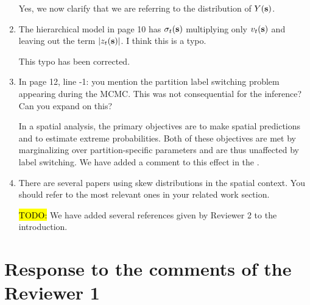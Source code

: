 \documentclass[11pt]{article}
\begin{document}
\begin{enumerate}[1.]
  \begin{response}
    Yes, we now clarify that we are referring to the distribution of $Y(\mbox{\bf s})$.
  \end{response}

  \item The hierarchical model in page 10 has $\sigma_t(\mbox{\bf s})$ multiplying only $v_t(\mbox{\bf s})$ and leaving out the term $|z_t(\mbox{\bf s})|$. I think this is a typo. \\

  \begin{response}
    This typo has been corrected.
  \end{response}

  \item In page 12, line -1: you mention the partition label switching problem appearing during the MCMC. This was not consequential for the inference? Can you expand on this? \\

  \begin{response}
    In a spatial analysis, the primary objectives are to make spatial predictions and to estimate extreme probabilities.
    Both of these objectives are met by marginalizing over partition-specific parameters and are thus unaffected by label switching.
    We have added a comment to this effect in the .
  \end{response}

  \item There are several papers using skew distributions in the spatial context. You should refer to the most relevant ones in your related work section. \\

  \begin{response}
    \hl{TODO:}
    We have added several references given by Reviewer 2 to the introduction.
  \end{response}

\end{enumerate}

\newpage
\section*{Response to the comments of the Reviewer 1}
\end{document}

